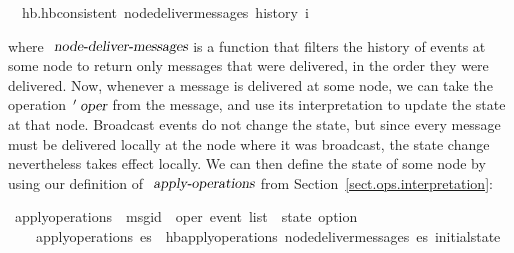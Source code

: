 \begin{isabelle}
\ \ {\isachardoublequoteopen}hb.hb{\isacharunderscore}consistent\ {\isacharparenleft}node{\isacharunderscore}deliver{\isacharunderscore}messages\ {\isacharparenleft}history\ i{\isacharparenright}{\isacharparenright}{\isachardoublequoteclose}
\end{isabelle}
\noindent
where $\isa{node-deliver-messages}$ is a function that filters the history of events at some node to return only messages that were delivered, in the order they were delivered.
Now, whenever a message is delivered at some node, we can take the operation $\isacharprime\isa{oper}$ from the message, and use its interpretation to update the state at that node.
Broadcast events do not change the state, but since every message must be delivered locally at the node where it was broadcast, the state change nevertheless takes effect locally.
We can then define the state of some node by using our definition of $\isa{apply-operations}$ from Section~\ref{sect.ops.interpretation}:
\begin{isabelle}
\ apply{\isacharunderscore}operations\ {\isacharcolon}{\isacharcolon}\ {\isachardoublequoteopen}{\isacharparenleft}{\isacharprime}msgid\ {\isasymtimes}\ {\isacharprime}oper{\isacharparenright}\ event\ list\ {\isasymRightarrow}\ {\isacharprime}state\ option{\isachardoublequoteclose}\ \\
~~~~{\isachardoublequoteopen}apply{\isacharunderscore}operations\ es\ {\isasymequiv}\ hb{\isachardot}apply{\isacharunderscore}operations\ {\isacharparenleft}node{\isacharunderscore}deliver{\isacharunderscore}messages\ es{\isacharparenright}\ initial{\isacharunderscore}state{\isachardoublequoteclose}
\end{isabelle}

